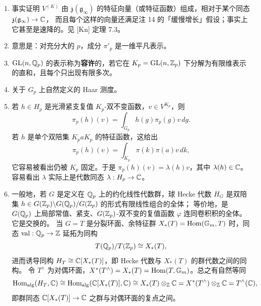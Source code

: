 \begin{enumerate}[label=\arabic*., leftmargin=1.9em, itemsep=1.2pt, topsep=2pt]
作为这样的模它分解为不可约成分，特别地，每个自守表示并不是 $\GL(n,\bbA)$ 的表示，而是
\[
(\mathfrak g_{\infty},K_{\infty})\times\GL(n,\bbA_{\mathrm f})
\]
模。
\item 事实证明 $V^{(K)}$ 由 $\mathfrak z(\mathfrak g_{\infty})$ 的特征向量（或特征函数）组成，相对于某个同态 $\mathfrak z(\mathfrak g_{\infty})\to\mathbb{C}$，
而且每个这样的向量还满足注 14 的「缓慢增长」假设；事实上它甚至是速降的。见 [Kn] 定理 7.3。
\item 意思是：对充分大的 $p$，成分 $\pi'_p$ 是一维平凡表示。
\item $\mathrm{GL}(n,\mathbb{Q}_p)$ 的表示称为\textbf{容许}的，若它在 $K_p=\mathrm{GL}(n,\mathbb{Z}_p)$ 下分解为有限维表示的直和，且每个只出现有限多次。
\item 关于 $G_p$ 上自然定义的 Haar 测度。
\item 若 $h\in H_p$ 是光滑紧支复值 $K_p$-双不变函数，$v\in V^{K_p}$，则
\[
\pi_p(h)(v)=\int_{G_p}h(g)\pi_p(g)v\,dg .
\]
若 $h$ 是单个双陪集 $K_paK_p$ 的特征函数，这给出
\[
\pi_p(h)(v)=\int_{K_p}\pi(k)\pi(a)v\,dk,
\]
它容易被看出仍被 $K_p$ 固定。于是 $\pi_p(h)(v)=\lambda(h)v$，其中 $\lambda(h)\in\mathbb{C}$。
容易看出 $\lambda$ 实际上是代数同态 $\lambda:H_p\to\mathbb{C}$。
\item 一般地，若 $G$ 是定义在 $\mathbb{Q}_p$ 上的约化线性代数群，球 Hecke 代数 $H_G$ 是双陪集 $h\in G(\mathbb{Z}_p)\backslash G(\mathbb{Q}_p)/G(\mathbb{Z}_p)$ 的形式有限线性组合的全体；
等价地，是 $G(\mathbb{Q}_p)$ 上局部常值、紧支、$G(\mathbb{Z}_p)$-双不变的复值函数 $\varphi$ 连同卷积积的全体。它是交换的。
当 $G=T$ 是分裂环面、余特征群 $X_*(T)=\mathrm{Hom}(\mathbb{G}_m,T)$ 时，同态 $\mathrm{val}:\mathbb{Q}_p\to\mathbb{Z}$ 延拓为同构
\[
T(\mathbb{Q}_p)/T(\mathbb{Z}_p)\cong X_*(T),
\]
进而诱导同构 $H_T\cong\mathbb{C}[X_*(T)]$，即 Hecke 代数与 $X_*(T)$ 的群代数之间的同构。
令 $T^{\wedge}$ 为对偶环面，$X^*(T^{\wedge})=X_*(T)=\mathrm{Hom}(T,\mathbb{G}_m)$。总之有自然等同
\[
\mathrm{Hom}_{\mathrm{alg}}(H_T,\mathbb{C})\cong\mathrm{Hom}_{\mathrm{alg}}(\mathbb{C}[X_*(T)],\mathbb{C})\cong X_*(T)\otimes_{\mathbb{Z}}\mathbb{C}=X^*(T^{\wedge})\otimes_{\mathbb{Z}}\mathbb{C}=T^{\wedge}(\mathbb{C}),
\]
即群同态 $\mathbb{C}[X_*(T)]\to\mathbb{C}$ 之群与对偶环面的复点之间。


\end{enumerate}
